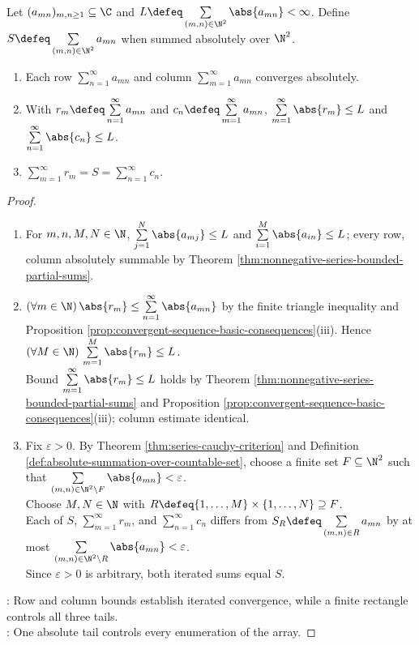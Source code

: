 \begin{theorem} \label{thm:fubini-countable-absolute-series} \\
Let $(a_{mn})_{m,n\geq1}\subseteq\C$ and $L\defeq\sum\limits_{(m,n)\in\N^2}\abs{a_{mn}}<\infty$. Define $S\defeq\sum\limits_{(m,n)\in\N^2}a_{mn}$ when summed absolutely over $\N^2$.
\begin{enumerate}[label=(\roman*)]
\setlength{\itemsep}{0pt}
\item Each row $\sum\limits_{n=1}^{\infty}a_{mn}$ and column $\sum\limits_{m=1}^{\infty}a_{mn}$ converges absolutely.
\item With $r_m\defeq\sum\limits_{n=1}^{\infty}a_{mn}$ and $c_n\defeq\sum\limits_{m=1}^{\infty}a_{mn}$, $\sum\limits_{m=1}^{\infty}\abs{r_m}\leq L$ and $\sum\limits_{n=1}^{\infty}\abs{c_n}\leq L$.
\item $\sum\limits_{m=1}^{\infty}r_m=S=\sum\limits_{n=1}^{\infty}c_n$.
\end{enumerate}
\begin{proof}
\begin{enumerate}[label=(\roman*)]
\setlength{\itemsep}{0pt}
\item For $m,n,M,N\in\N$, $\sum\limits_{j=1}^{N}\abs{a_{mj}}\leq L$ and $\sum\limits_{i=1}^{M}\abs{a_{in}}\leq L$; every row, column absolutely summable by Theorem \ref{thm:nonnegative-series-bounded-partial-sums}.
\item $(\forall m\in\N)\,\abs{r_m}\leq\sum\limits_{n=1}^{\infty}\abs{a_{mn}}$ by the finite triangle inequality and Proposition \ref{prop:convergent-sequence-basic-consequences}(iii). Hence $(\forall M\in\N)\,\sum\limits_{m=1}^{M}\abs{r_m}\leq L$.\\
Bound $\sum\limits_{m=1}^{\infty}\abs{r_m}\leq L$ holds by Theorem \ref{thm:nonnegative-series-bounded-partial-sums} and Proposition \ref{prop:convergent-sequence-basic-consequences}(iii); column estimate identical.
\item Fix $\varepsilon>0$. By Theorem \ref{thm:series-cauchy-criterion} and Definition \ref{def:absolute-summation-over-countable-set}, choose a finite set $F\subseteq\N^2$ such that $\sum\limits_{(m,n)\in\N^2\setminus F}\abs{a_{mn}}<\varepsilon$.\\
Choose $M,N\in\N$ with $R\defeq\{1,\ldots,M\}\times\{1,\ldots,N\}\supseteq F$.\\
Each of $S$, $\sum\limits_{m=1}^{\infty}r_m$, and $\sum\limits_{n=1}^{\infty}c_n$ differs from $S_R\defeq\sum\limits_{(m,n)\in R}a_{mn}$ by at most $\sum\limits_{(m,n)\in\N^2\setminus R}\abs{a_{mn}}<\varepsilon$.\\
Since $\varepsilon>0$ is arbitrary, both iterated sums equal $S$.
\end{enumerate}
: Row and column bounds establish iterated convergence, while a finite rectangle controls all three tails.\\
: One absolute tail controls every enumeration of the array.
\end{proof}
\end{theorem}

